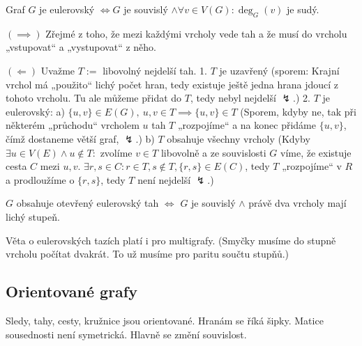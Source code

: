 \documentclass[12pt]{article}					%
\begin{document}
    \begin{veta}
        Graf $G$ je eulerovský $\Leftrightarrow G$ je souvislý $\land \forall v \in V(G): \deg_G(v)$ je sudý.
        \begin{dukazin}
            $(\implies)$ Zřejmé z toho, že mezi každými vrcholy vede tah a že musí do vrcholu „vstupovat“ a „vystupovat“ z něho.

            $(\Leftarrow)$ Uvažme $T := $ libovolný nejdelší tah. 1. $T$ je uzavřený (sporem: Krajní vrchol má „použito“ lichý počet hran, tedy existuje ještě jedna hrana jdoucí z tohoto vrcholu. Tu ale můžeme přidat do $T$, tedy nebyl nejdelší $\lightning$.) 2. $T$ je eulerovský: a) $\{u, v\} \in E(G),\ u, v \in T \implies \{u, v\} \in T$ (Sporem, kdyby ne, tak při některém „průchodu“ vrcholem $u$ tah $T$ „rozpojíme“ a na konec přidáme $\{u, v\}$, čímž dostaneme větší graf, $\lightning$.) b) $T$ obsahuje všechny vrcholy (Kdyby $\exists u \in V(E) \land u \notin T:$ zvolíme $v \in T$ libovolně a ze souvislosti $G$ víme, že existuje cesta $C$ mezi $u, v$. $\exists r, s \in C: r\in T, s \notin T, \{r, s\}\in E(C)$, tedy $T$ „rozpojíme“ v $R$ a prodloužíme o $\{r, s\}$, tedy $T$ není nejdelší $\lightning$.)
        \end{dukazin}
    \end{veta}

    \begin{priklad}
        $G$ obsahuje otevřený eulerovský tah $\Leftrightarrow$ $G$ je souvislý $\land$ právě dva vrcholy mají lichý stupeň.
    \end{priklad}

    \begin{poznamka}
        Věta o eulerovských tazích platí i pro multigrafy. (Smyčky musíme do stupně vrcholu počítat dvakrát. To už musíme pro paritu součtu stupňů.)
    \end{poznamka}

    \subsection{Orientované grafy}
        \begin{poznamka}[Co se změnilo]
            Sledy, tahy, cesty, kružnice jsou orientované. Hranám se říká šipky. Matice sousednosti není symetrická. Hlavně se změní souvislost.
        \end{poznamka}
\end{document}

